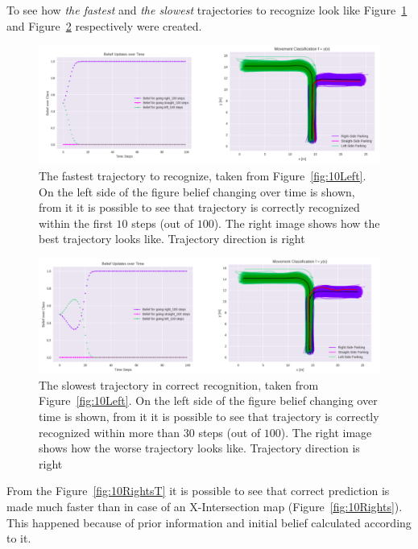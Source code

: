 To see how \textit{the fastest} and \textit{the slowest} trajectories to recognize look like Figure~\ref{fig:RightGoodT} and Figure~\ref{fig:RightBadT} respectively were created.

\begin{figure}[H]
	\centering  	
	\includegraphics[width=14cm]{img/goodRightT.png}
	\caption{The fastest trajectory to recognize, taken from Figure~\ref{fig:10Left}. On the left side of the figure belief changing over time is shown, from it it is possible to see that trajectory is correctly recognized within the first $10$ steps (out of $100$). The right image shows how the best trajectory looks like. Trajectory direction is right}
	\label{fig:RightGoodT}    
\end{figure}

\begin{figure}[H]
	\centering  	
	\includegraphics[width=14cm]{img/badRightT.png}
	\caption{The slowest trajectory in correct recognition, taken from Figure~\ref{fig:10Left}. On the left side of the figure belief changing over time is shown, from it it is possible to see that trajectory is correctly recognized within more than $30$ steps (out of $100$). The right image shows how the worse trajectory looks like. Trajectory direction is right}
	\label{fig:RightBadT}    
\end{figure}

From the Figure~\ref{fig:10RightsT} it is possible to see that correct prediction is made much faster than in case of an X-Intersection map (Figure~\ref{fig:10Rights}). This happened because of prior information and initial belief calculated according to it.

